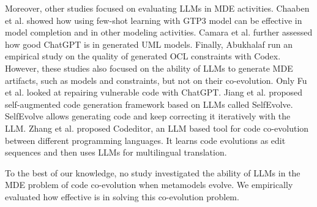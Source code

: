 Moreover, other studies focused on evaluating LLMs in MDE activities. 
Chaaben et al. \cite{chaaben2023towards} showed how using few-shot learning with GTP3 model can be effective in model completion and in other modeling activities. 
%
Camara et al. \cite{camara2023assessment} further assessed how good ChatGPT is in generated UML models.
%
Finally, Abukhalaf \cite{AbukhalafHK23} run an empirical study on the quality of generated OCL constraints with Codex. %
%
However, these studies also focused on the ability of LLMs to generate MDE artifacts, such as models and constraints, but not on their co-evolution. 
Only Fu et al. \cite{fu2023chatgpt} looked at repairing vulnerable code with ChatGPT. 
%
Jiang et al. \cite{jiang2023selfevolve} proposed self-augmented code generation framework based on LLMs called SelfEvolve. SelfEvolve allows generating code and keep correcting it iteratively with the LLM. %
%
Zhang et al. \cite{zhang2023multilingual} proposed Codeditor, an LLM based tool for code co-evolution between different programming languages. It learns code evolutions as edit sequences and then uses LLMs for multilingual translation. %

To the best of our knowledge, no study investigated the ability of LLMs in the MDE problem of code co-evolution when metamodels evolve. We empirically evaluated how effective is \LLM in solving this co-evolution problem. 